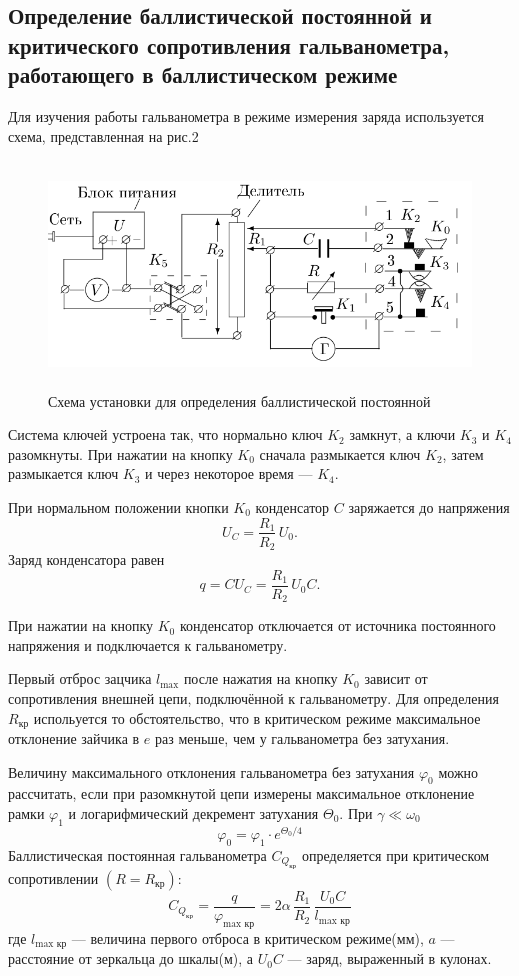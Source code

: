 \documentclass[12pt]{article}
\begin{document}
\subsection*{Определение баллистической постоянной и критического сопротивления гальванометра, работающего в баллистическом режиме}
\par
	Для изучения работы гальванометра в режиме измерения заряда используется схема, представленная на рис.2
\begin{figure}[h!]
	\centering
	\includegraphics[width = 15cm, height = 6cm]{image2.png}
	\caption{Схема установки для определения баллистической постоянной}
\end{figure}	 	 
\par
	Система ключей устроена так, что нормально ключ $K_2$ замкнут, а ключи $K_3$ и $K_4$ разомкнуты. При нажатии на кнопку $K_0$ сначала размыкается ключ $K_2$, затем размыкается ключ $K_3$ и через некоторое время --- $K_4$.
\par	
	При нормальном положении кнопки $K_0$ конденсатор $C$ заряжается до напряжения
\[
	U_C = \frac{R_1}{R_2}\,U_0.	
\]	 
Заряд конденсатора равен
\[
	q = CU_C = \frac{R_1}{R_2}\, U_0 C.
\]
\par
	При нажатии на кнопку $K_0$ конденсатор отключается от источника постоянного напряжения и подключается к гальванометру.
\par	
	Первый отброс зацчика $l_\text{max}$ после нажатия на кнопку $K_0$ зависит от сопротивления внешней цепи, подключённой к гальванометру. Для определения $R_\text{кр}$ испольуется то обстоятельство, что в критическом режиме максимальное отклонение зайчика в $e$ раз меньше, чем у гальванометра без затухания.
\par
	Величину максимального отклонения гальванометра без затухания $\varphi_0$ можно рассчитать, если при разомкнутой цепи измерены максимальное отклонение рамки $\varphi_1$ и логарифмический декремент затухания $\Theta_0$. При $\gamma \ll \omega_0$
\[
	\varphi_0 = \varphi_1 \cdot e^{\Theta_0 / 4}
\]	 
Баллистическая постоянная гальванометра $C_\text{$Q_\text{кр}$}$ определяется при критическом сопротивлении $\left(R = R_\text{кр}\right)$:
\[
	C_\text{$Q_\text{кр}$} = \frac{q}{\varphi_\text{max кр}} = 2\alpha\,\frac{R_1}{R_2}\,\frac{U_0 C}{l_\text{max кр}}
\]
где $l_\text{max кр}$ --- величина первого отброса в критическом режиме(мм), $a$ --- расстояние от зеркальца до шкалы(м), а $U_0 C$ --- заряд, выраженный в кулонах.
\end{document}
